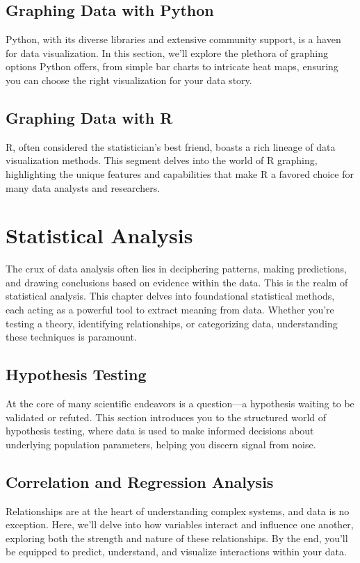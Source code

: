 \documentclass{book}
\begin{document}
\section{Graphing Data with Python}
Python, with its diverse libraries and extensive community support, is a haven for data visualization. In this section, we'll explore the plethora of graphing options Python offers, from simple bar charts to intricate heat maps, ensuring you can choose the right visualization for your data story.

\section{Graphing Data with R}
R, often considered the statistician's best friend, boasts a rich lineage of data visualization methods. This segment delves into the world of R graphing, highlighting the unique features and capabilities that make R a favored choice for many data analysts and researchers.

\chapter{Statistical Analysis}
The crux of data analysis often lies in deciphering patterns, making predictions, and drawing conclusions based on evidence within the data. This is the realm of statistical analysis. This chapter delves into foundational statistical methods, each acting as a powerful tool to extract meaning from data. Whether you're testing a theory, identifying relationships, or categorizing data, understanding these techniques is paramount.

\section{Hypothesis Testing}
At the core of many scientific endeavors is a question—a hypothesis waiting to be validated or refuted. This section introduces you to the structured world of hypothesis testing, where data is used to make informed decisions about underlying population parameters, helping you discern signal from noise.

\section{Correlation and Regression Analysis}
Relationships are at the heart of understanding complex systems, and data is no exception. Here, we'll delve into how variables interact and influence one another, exploring both the strength and nature of these relationships. By the end, you'll be equipped to predict, understand, and visualize interactions within your data.
\end{document}
